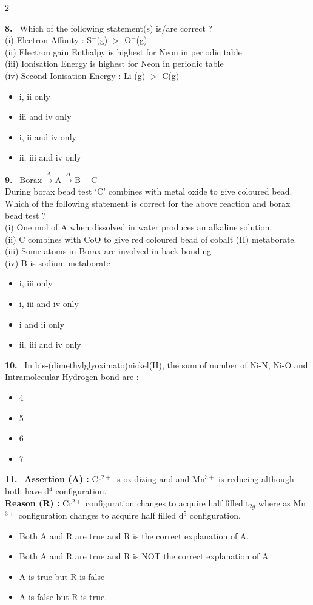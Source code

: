 \documentclass[10pt]{extarticle}
\newcommand{\qn}[1]{\par\smallskip\noindent\textbf{#1.}~}
\newenvironment{qoptions}{\begin{itemize}[leftmargin=1.8em,itemsep=1pt,topsep=2pt,label={}]}{\end{itemize}}
\newcommand{\opt}[2]{\item[(#1)] #2}
\begin{document}
\begin{multicols}{2}
\qn{8} Which of the following statement(s) is/are correct ?\\
(i) Electron Affinity : S$^{-}$(g) $>$ O$^{-}$(g)\\
(ii) Electron gain Enthalpy is highest for Neon in periodic table\\
(iii) Ionisation Energy is highest for Neon in periodic table\\
(iv) Second Ionisation Energy : Li (g) $>$ C(g)
\begin{qoptions}
\opt{A}{i, ii only}
\opt{B}{iii and iv only}
\opt{C}{i, ii and iv only}
\opt{D}{ii, iii and iv only}
\end{qoptions}

\qn{9} $\mathrm{Borax}\xrightarrow{\ \Delta\ }\mathrm{A}\xrightarrow{\ \Delta\ }\mathrm{B}+\mathrm{C}$\\
During borax bead test `C' combines with metal oxide to give coloured bead. Which of the following statement is correct for the above reaction and borax bead test ?\\
(i) One mol of A when dissolved in water produces an alkaline solution.\\
(ii) C combines with CoO to give red coloured bead of cobalt (II) metaborate.\\
(iii) Some atoms in Borax are involved in back bonding\\
(iv) B is sodium metaborate
\begin{qoptions}
\opt{A}{i, iii only}
\opt{B}{i, iii and iv only}
\opt{C}{i and ii only}
\opt{D}{ii, iii and iv only}
\end{qoptions}

\qn{10} In bis-(dimethylglyoximato)nickel(II), the sum of number of Ni-N, Ni-O and Intramolecular Hydrogen bond are :
\begin{qoptions}
\opt{A}{4}
\opt{B}{5}
\opt{C}{6}
\opt{D}{7}
\end{qoptions}

\qn{11} \textbf{Assertion (A) :} Cr$^{2+}$ is oxidizing and and Mn$^{3+}$ is reducing although both have d$^4$ configuration.\\
\textbf{Reason (R) :} Cr$^{2+}$ configuration changes to acquire half filled t$_{2g}$ where as Mn$^{3+}$ configuration changes to acquire half filled d$^5$ configuration.
\begin{qoptions}
\opt{A}{Both A and R are true and R is the correct explanation of A.}
\opt{B}{Both A and R are true and R is NOT the correct explanation of A}
\opt{C}{A is true but R is false}
\opt{D}{A is false but R is true.}
\end{qoptions}


\end{multicols}
\end{document}

